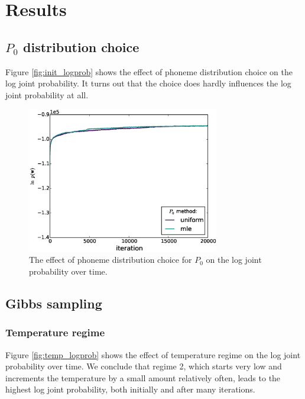 \section{Results}

\subsection{$P_0$ distribution choice}

Figure \ref{fig:init_logprob} shows the effect of phoneme distribution choice on the log joint probability. It turns out that the choice does hardly influences the log joint probability at all.

\begin{figure}
  \centering
    \includegraphics[width=0.75\textwidth]{images/P0_method-log_prob}
  \caption{The effect of phoneme distribution choice for $P_0$ on the log joint probability over time.}
  \label{fig:P0_logprob}
\end{figure}

\subsection{Gibbs sampling}

\subsubsection{Temperature regime}

Figure \ref{fig:temp_logprob} shows the effect of temperature regime on the log joint probability over time. We conclude that regime 2, which starts very low and increments the temperature by a small amount relatively often, leads to the highest log joint probability, both initially and after many iterations.

